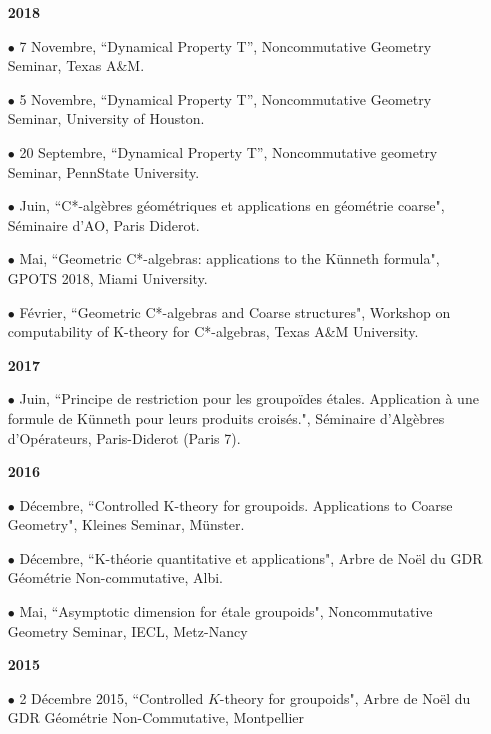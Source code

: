 \documentclass[a4paper,11pt]{article}
\newcommand\espace{\vrule height 20pt width 0pt}
\begin{document}
\begin{itemize}
\item[\textbf{2018}]
\item[$\bullet$] 7 Novembre, ``Dynamical Property T'', Noncommutative Geometry Seminar, Texas A\&M.
\item[$\bullet$] 5 Novembre, ``Dynamical Property T'', Noncommutative Geometry Seminar, University of Houston.
\item[$\bullet$] 20 Septembre, ``Dynamical Property T'', Noncommutative geometry Seminar, PennState University.
\item[$\bullet$] Juin, ``C*-alg\`ebres g\'eom\'etriques et applications en g\'eom\'etrie coarse", S\'eminaire d'AO, Paris Diderot.
\item[$\bullet$] Mai, ``Geometric C*-algebras: applications to the K\"unneth formula", GPOTS 2018, Miami University.
\item[$\bullet$] F\'evrier, ``Geometric C*-algebras and Coarse structures", Workshop on computability of K-theory for C*-algebras, Texas A\&M University.
\end{itemize}

\begin{itemize}
\item[\textbf{2017}]
\item[$\bullet$] Juin, ``Principe de restriction pour les groupoïdes étales. Application à une formule de Künneth pour leurs produits croisés.", Séminaire d'Algèbres d'Opérateurs, Paris-Diderot (Paris 7).
\end{itemize}
\newpage
\begin{itemize}
\item[\textbf{2016}]
\item[$\bullet$] D\'ecembre, ``Controlled K-theory for groupoids. Applications to Coarse Geometry", Kleines Seminar, Münster.
\item[$\bullet$] D\'ecembre, ``K-théorie quantitative et applications", Arbre de Noël du GDR Géométrie Non-commutative, Albi.
\item[$\bullet$] Mai, ``Asymptotic dimension for étale groupoids", Noncommutative Geometry Seminar, IECL, Metz-Nancy
\end{itemize}

\begin{itemize}
\item[\textbf{2015}]
\item[$\bullet$] 2 D\'ecembre 2015, ``Controlled $K$-theory for groupoids", Arbre de Noël du GDR Géométrie Non-Commutative, Montpellier
\end{itemize}
\espace
\end{document}
